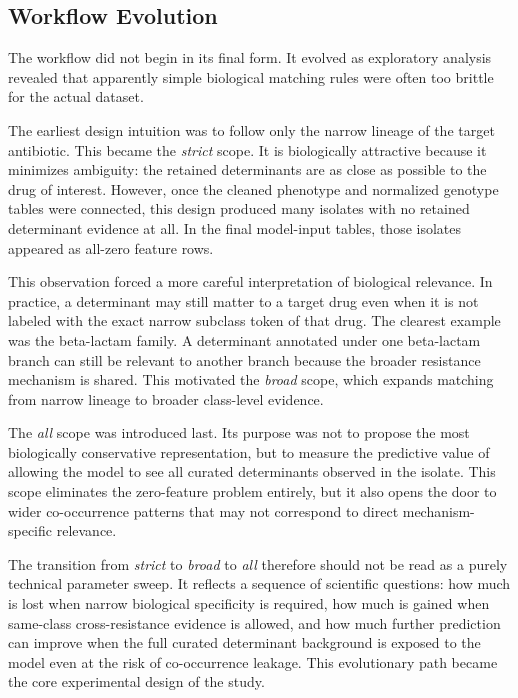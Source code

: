 \subsection{Workflow Evolution}

The workflow did not begin in its final form. It evolved as exploratory analysis revealed that apparently simple biological matching rules were often too brittle for the actual dataset.

The earliest design intuition was to follow only the narrow lineage of the target antibiotic. This became the \textit{strict} scope. It is biologically attractive because it minimizes ambiguity: the retained determinants are as close as possible to the drug of interest. However, once the cleaned phenotype and normalized genotype tables were connected, this design produced many isolates with no retained determinant evidence at all. In the final model-input tables, those isolates appeared as all-zero feature rows.

This observation forced a more careful interpretation of biological relevance. In practice, a determinant may still matter to a target drug even when it is not labeled with the exact narrow subclass token of that drug. The clearest example was the beta-lactam family. A determinant annotated under one beta-lactam branch can still be relevant to another branch because the broader resistance mechanism is shared. This motivated the \textit{broad} scope, which expands matching from narrow lineage to broader class-level evidence.

The \textit{all} scope was introduced last. Its purpose was not to propose the most biologically conservative representation, but to measure the predictive value of allowing the model to see all curated determinants observed in the isolate. This scope eliminates the zero-feature problem entirely, but it also opens the door to wider co-occurrence patterns that may not correspond to direct mechanism-specific relevance.

The transition from \textit{strict} to \textit{broad} to \textit{all} therefore should not be read as a purely technical parameter sweep. It reflects a sequence of scientific questions: how much is lost when narrow biological specificity is required, how much is gained when same-class cross-resistance evidence is allowed, and how much further prediction can improve when the full curated determinant background is exposed to the model even at the risk of co-occurrence leakage. This evolutionary path became the core experimental design of the study.
